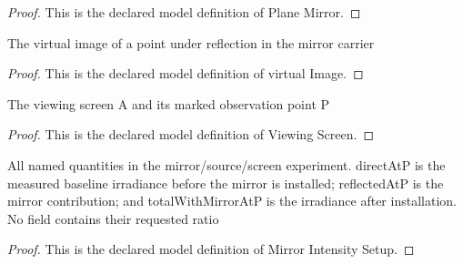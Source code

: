 \begin{proof}
  This is the declared model definition of Plane Mirror.
\end{proof}
\begin{definition}
  \label{def:physics:phyx-mini-0163:phyxminiproblems-problemphyxmini0163-planemirror-virtualimage}
  The virtual image of a point under reflection in the mirror carrier
\end{definition}
\begin{proof}
  This is the declared model definition of virtual Image.
\end{proof}
\begin{definition}
  \label{def:physics:phyx-mini-0163:phyxminiproblems-problemphyxmini0163-viewingscreen}
  The viewing screen A and its marked observation point P
\end{definition}
\begin{proof}
  This is the declared model definition of Viewing Screen.
\end{proof}
\begin{definition}
  \label{def:physics:phyx-mini-0163:phyxminiproblems-problemphyxmini0163-mirrorintensitysetup}
  All named quantities in the mirror/source/screen experiment. directAtP is the measured baseline irradiance before the mirror is installed; reflectedAtP is the mirror contribution; and totalWithMirrorAtP is the irradiance after installation. No field contains their requested ratio
\end{definition}
\begin{proof}
  This is the declared model definition of Mirror Intensity Setup.
\end{proof}
